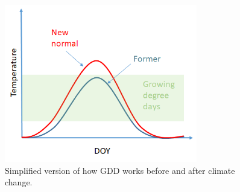 \documentclass[11pt]{article}
\begin{document}
\begin{figure}[h!]
\includegraphics[width=0.75\textwidth]{..//figures/simpletempcurve_fromlucidboard.png}
\caption{Simplified version of how GDD works before and after climate change.}
\label{fig:simpletemp}
\end{figure}
\fi
\end{document}
